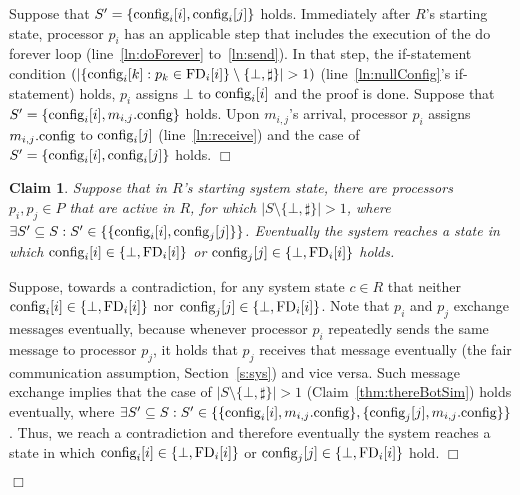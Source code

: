 \documentclass[11pt]{article}
\newtheorem{claim}[theorem]{Claim}
\newenvironment{proof}{\noindent{\bf Proof.}}{\hfill$\Box$}
\begin{document}
\begin{proof}
\begin{proof}
Suppose that $S' = \{ \textnormal{config}_i[i], \textnormal{config}_i[j] \}$ holds. Immediately after $R$'s starting state, processor $p_i$ has an applicable step that includes the execution of the do forever loop (line~\ref{ln:doForever} to~\ref{ln:send}). In that step, the if-statement condition 
$(|  \{ \textnormal{config}_i[k] : p_k \in \textnormal{FD}_i[i] \}  \setminus \{ \bot, \sharp \} | > 1)$
(line~\ref{ln:nullConfig}'s if-statement) holds, $p_i$ assigns $\bot$ to $\textnormal{config}_i[i]$ and the proof is done. Suppose that $S' = \{ \textnormal{config}_i[i], m_{i,j}.\textnormal{config} \}$ holds. Upon $m_{i,j}$'s arrival, processor $p_i$ assigns $m_{i,j}.\textnormal{config}$ to $\textnormal{config}_i[j]$ (line~\ref{ln:receive}) and the case of $S' = \{ \textnormal{config}_i[i], \textnormal{config}_i[j] \}$ holds.
\end{proof}



\begin{claim}
\label{thm:thereBot}
Suppose that in $R$'s starting system state, there are processors $p_i, p_j \in P$ that are active in $R$, for which $|S  \setminus \{ \bot, \sharp \} |>1$, where $\exists S' \subseteq S : S' \in \{ \{ \textnormal{config}_i[i], \textnormal{config}_j[j] \} \}$. Eventually the system reaches a state in which  $\textnormal{config}_i[i] \in \{ \bot, \textnormal{FD}_i[i] \}$ or $\textnormal{config}_j[j] \in \{ \bot, \textnormal{FD}_i[i] \}$ holds. 
\end{claim} 


\begin{proof}
Suppose, towards a contradiction, for any system state $c \in R$ that neither $\textnormal{config}_i[i] \in \{ \bot, \textnormal{FD}_i[i] \}$ nor $\textnormal{config}_j[j] \in \{ \bot, \textnormal{FD}_i[i] \}$. Note that $p_i$ and $p_j$ exchange messages eventually, because whenever processor $p_i$ repeatedly sends the same message to processor $p_j$, it holds that $p_j$ receives that message eventually (the fair communication assumption, Section~\ref{s:sys}) and vice versa. Such message exchange implies that the case of $|S  \setminus \{ \bot, \sharp \} |>1$ (Claim~\ref{thm:thereBotSim}) holds eventually, where $\exists S' \subseteq S : S' \in \{ \{ \textnormal{config}_i[i], m_{i,j}.\textnormal{config} \}, \{ \textnormal{config}_j[j], m_{i,j}.\textnormal{config} \}\}$. Thus, we reach a contradiction and therefore eventually the system reaches a state in which 
 $\textnormal{config}_i[i] \in \{ \bot, \textnormal{FD}_i[i] \}$ or $\textnormal{config}_j[j] \in \{ \bot, \textnormal{FD}_i[i] \}$ hold.
\end{proof}







\end{proof}
\end{document}
